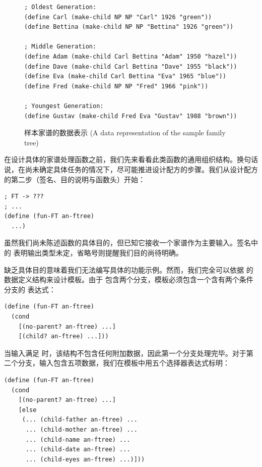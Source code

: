 \begin{figure}[htbp]
  \centering
\begin{lstlisting}[language=BSL, basicstyle=\scriptsize\ttfamily]
; Oldest Generation:
(define Carl (make-child NP NP "Carl" 1926 "green"))
(define Bettina (make-child NP NP "Bettina" 1926 "green"))

; Middle Generation:
(define Adam (make-child Carl Bettina "Adam" 1950 "hazel"))
(define Dave (make-child Carl Bettina "Dave" 1955 "black"))
(define Eva (make-child Carl Bettina "Eva" 1965 "blue"))
(define Fred (make-child NP NP "Fred" 1966 "pink"))

; Youngest Generation:
(define Gustav (make-child Fred Eva "Gustav" 1988 "brown"))
\end{lstlisting}
  \caption{样本家谱的数据表示 (A data representation of the sample family tree)}
  \label{fig:112}
\end{figure}

在设计具体的家谱处理函数之前，我们先来看看此类函数的通用组织结构。换句话说，在尚未确定具体任务的情况下，尽可能推进设计配方的步骤。我们从设计配方的第二步（签名、目的说明与函数头）开始：

\begin{lstlisting}[language=BSL]
; FT -> ???
; ...
(define (fun-FT an-ftree)
  ...)
\end{lstlisting}

虽然我们尚未陈述函数的具体目的，但已知它接收一个家谱作为主要输入。签名中的  表明输出类型未定，省略号则提醒我们目的尚待明确。

缺乏具体目的意味着我们无法编写具体的功能示例。然而，我们完全可以依据  的数据定义结构来设计模板。由于  包含两个分支，模板必须包含一个含有两个条件分支的  表达式：

\begin{lstlisting}[language=BSL]
(define (fun-FT an-ftree)
  (cond
    [(no-parent? an-ftree) ...]
    [(child? an-ftree) ...]))
\end{lstlisting}

当输入满足  时，该结构不包含任何附加数据，因此第一个分支处理完毕。对于第二个分支，输入包含五项数据，我们在模板中用五个选择器表达式标明：

\begin{lstlisting}[language=BSL]
(define (fun-FT an-ftree)
  (cond
    [(no-parent? an-ftree) ...]
    [else
     (... (child-father an-ftree) ...
      ... (child-mother an-ftree) ...
      ... (child-name an-ftree) ...
      ... (child-date an-ftree) ...
      ... (child-eyes an-ftree) ...)]))
\end{lstlisting}

